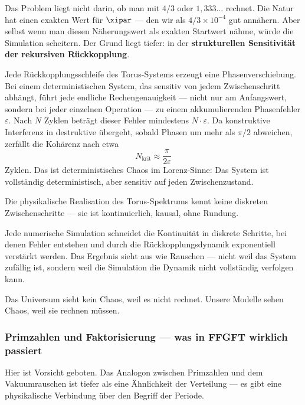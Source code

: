 Das Problem liegt nicht darin, ob man mit $4/3$ oder $1{,}333\ldots$ rechnet.
Die Natur hat einen exakten Wert für $\xipar$ — den wir als $4/3 \times 10^{-4}$
gut annähern. Aber selbst wenn man diesen Näherungswert als exakten Startwert nähme,
würde die Simulation scheitern. Der Grund liegt tiefer: in der \textbf{strukturellen
Sensitivität der rekursiven Rückkopplung}.

Jede Rückkopplungsschleife des Torus-Systems erzeugt eine Phasenverschiebung.
Bei einem deterministischen System, das sensitiv von jedem Zwischenschritt abhängt,
führt jede endliche Rechengenauigkeit — nicht nur am Anfangswert, sondern
bei jeder einzelnen Operation — zu einem akkumulierenden Phasenfehler $\varepsilon$.
Nach $N$ Zyklen beträgt dieser Fehler mindestens $N \cdot \varepsilon$.
Da konstruktive Interferenz in destruktive übergeht, sobald Phasen um mehr als
$\pi/2$ abweichen, zerfällt die Kohärenz nach etwa
\begin{equation}
    N_\text{krit} \approx \frac{\pi}{2\varepsilon}
\end{equation}
Zyklen. Das ist deterministisches Chaos im Lorenz-Sinne: Das System ist vollständig
deterministisch, aber sensitiv auf jeden Zwischenzustand.

\begin{keypoint}
Die physikalische Realisation des Torus-Spektrums kennt keine diskreten
Zwischenschritte — sie ist kontinuierlich, kausal, ohne Rundung.

Jede numerische Simulation schneidet die Kontinuität in diskrete Schritte,
bei denen Fehler entstehen und durch die Rückkopplungsdynamik exponentiell
verstärkt werden. Das Ergebnis sieht aus wie Rauschen — nicht weil das
System zufällig ist, sondern weil die Simulation die Dynamik nicht vollständig
verfolgen kann.

Das Universum sieht kein Chaos, weil es nicht rechnet.
Unsere Modelle sehen Chaos, weil sie rechnen müssen.
\end{keypoint}

\subsubsection*{Primzahlen und Faktorisierung — was in FFGFT wirklich passiert}

Hier ist Vorsicht geboten. Das Analogon zwischen Primzahlen und dem Vakuumrauschen
ist tiefer als eine Ähnlichkeit der Verteilung — es gibt eine physikalische Verbindung
über den Begriff der Periode.

